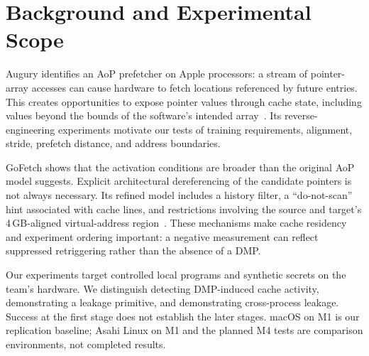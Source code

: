 \section{Background and Experimental Scope}
Augury identifies an AoP prefetcher on Apple processors: a stream of pointer-array accesses can cause hardware to fetch locations referenced by future entries. This creates opportunities to expose pointer values through cache state, including values beyond the bounds of the software's intended array~\cite{augury}. Its reverse-engineering experiments motivate our tests of training requirements, alignment, stride, prefetch distance, and address boundaries.

GoFetch shows that the activation conditions are broader than the original AoP model suggests. Explicit architectural dereferencing of the candidate pointers is not always necessary. Its refined model includes a history filter, a ``do-not-scan'' hint associated with cache lines, and restrictions involving the source and target's 4\,GB-aligned virtual-address region~\cite{gofetch}. These mechanisms make cache residency and experiment ordering important: a negative measurement can reflect suppressed retriggering rather than the absence of a DMP.

Our experiments target controlled local programs and synthetic secrets on the team's hardware. We distinguish detecting DMP-induced cache activity, demonstrating a leakage primitive, and demonstrating cross-process leakage. Success at the first stage does not establish the later stages. macOS on M1 is our replication baseline; Asahi Linux on M1 and the planned M4 tests are comparison environments, not completed results.
